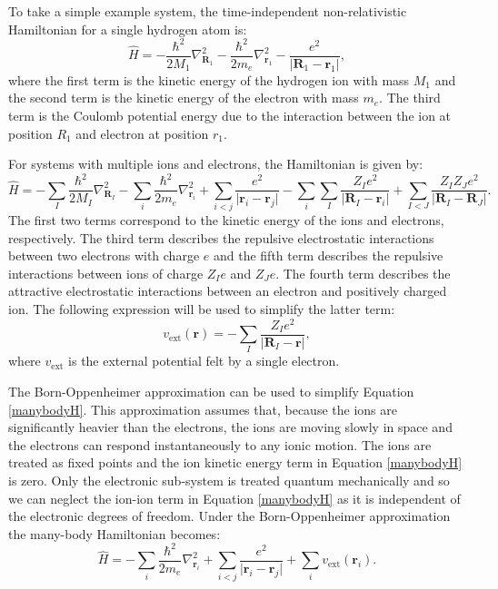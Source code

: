 To take a simple example system, the time-independent non-relativistic Hamiltonian for a single hydrogen atom is:
\begin{equation} \label{singleparticle}
\hat{H} = -\frac{\hbar^2}{2M_1}\nabla_{\textbf{R}_1}^2-\frac{\hbar^2}{2m_e}\nabla_{\textbf{r}_1}^2-\frac{e^2}{\lvert\textbf{R}_1-\textbf{r}_1\rvert},
\end{equation}
where the first term is the kinetic energy of the hydrogen ion with mass $M_1$ and the second term is the kinetic energy of the electron with mass $m_e$. The third term is the Coulomb potential energy due to the interaction between the ion at position $R_1$ and electron at position $r_1$. 

For systems with multiple ions and electrons, the Hamiltonian is given by:\autocite{Kaxiras2007}
\begin{equation} \label{manybodyH}
\hat{H} = -\sum_{I}\frac{\hbar^2}{2M_I}\nabla_{\textbf{R}_I}^2-\sum_{i}\frac{\hbar^2}{2m_e}\nabla_{\textbf{r}_i}^2 +\sum_{i<j}\frac{e^2}{\lvert\textbf{r}_i-\textbf{r}_j\rvert}-\sum_{i}\sum_{I}\frac{Z_Ie^2}{\lvert\textbf{R}_I-\textbf{r}_i\rvert}+\sum_{I<J}\frac{Z_IZ_Je^2}{\lvert\textbf{R}_I-\textbf{R}_J\rvert}.
\end{equation}
The first two terms correspond to the kinetic energy of the ions and electrons, respectively. The third term describes the repulsive electrostatic interactions between two electrons with charge $e$ and the fifth term describes the repulsive interactions between ions of charge $Z_Ie$ and $Z_Je$. The fourth term describes the attractive electrostatic interactions between an electron and positively charged ion. The following expression will be used to simplify the latter term:
\begin{equation}
v_\textrm{ext}(\textbf{r}) = -\sum_I\frac{Z_Ie^2}{\lvert\textbf{R}_I-\textbf{r}\rvert},
\end{equation}
where $v_\textrm{ext}$ is the external potential felt by a single electron. 

The Born-Oppenheimer approximation can be used to simplify Equation \ref{manybodyH}.\autocite{Born1927} This approximation assumes that, because the ions are significantly heavier than the electrons, the ions are moving slowly in space and the electrons can respond instantaneously to any ionic motion. The ions are treated as fixed points and the ion kinetic energy term in Equation \ref{manybodyH} is zero. Only the electronic sub-system is treated quantum mechanically and so we can neglect the ion-ion term in Equation \ref{manybodyH} as it is independent of the electronic degrees of freedom.
Under the Born-Oppenheimer approximation the many-body Hamiltonian becomes:\autocite{Kaxiras2007}
\begin{equation}
\hat{H} = -\sum_{i}\frac{\hbar^2}{2m_e}\nabla_{\textbf{r}_i}^2 +\sum_{i<j}\frac{e^2}{\lvert\textbf{r}_i-\textbf{r}_j\rvert}+\sum_{i}v_\textrm{ext}(\textbf{r}_i).
\end{equation}



